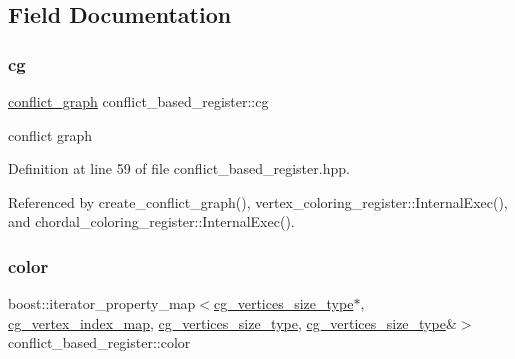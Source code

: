 \subsection{Field Documentation}
\mbox{\label{classconflict__based__register_ab595177e8e1f8a5b3e2835a2ddd2a7cf}} 
\subsubsection{\texorpdfstring{cg}{cg}}
{\footnotesize\ttfamily \hyperlink{classconflict__based__register_ae3dddabefe4d2f171c7076d0c1c22f05}{conflict\+\_\+graph} conflict\+\_\+based\+\_\+register\+::cg\hspace{0.3cm}{\ttfamily [protected]}}



conflict graph 



Definition at line 59 of file conflict\+\_\+based\+\_\+register.\+hpp.



Referenced by create\+\_\+conflict\+\_\+graph(), vertex\+\_\+coloring\+\_\+register\+::\+Internal\+Exec(), and chordal\+\_\+coloring\+\_\+register\+::\+Internal\+Exec().

\mbox{\label{classconflict__based__register_afcda446d7720ae3841f8b5cdf1517eec}} 
\subsubsection{\texorpdfstring{color}{color}}
{\footnotesize\ttfamily boost\+::iterator\+\_\+property\+\_\+map$<$\hyperlink{classconflict__based__register_a7708aaa8ca3c7edc5006102d258ce126}{cg\+\_\+vertices\+\_\+size\+\_\+type}$\ast$, \hyperlink{classconflict__based__register_a4244cac2851e9a316f0debd0563dd2d2}{cg\+\_\+vertex\+\_\+index\+\_\+map}, \hyperlink{classconflict__based__register_a7708aaa8ca3c7edc5006102d258ce126}{cg\+\_\+vertices\+\_\+size\+\_\+type}, \hyperlink{classconflict__based__register_a7708aaa8ca3c7edc5006102d258ce126}{cg\+\_\+vertices\+\_\+size\+\_\+type}\&$>$ conflict\+\_\+based\+\_\+register\+::color\hspace{0.3cm}{\ttfamily [protected]}}



